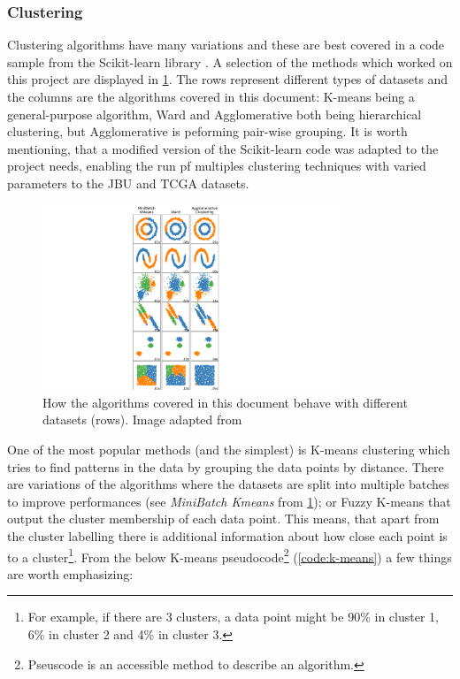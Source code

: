 \subsubsection{Clustering} \label{s:lit:clustering}

Clustering algorithms have many variations and these are best covered in a code sample \cite{Scikit-learn_undated-ax} from the Scikit-learn library \cite{Pedregosa2011-ts}. A selection of the methods which worked on this project are displayed in \cref{fig:clustering_types}. The rows represent different types of datasets and the columns are the algorithms covered in this document: K-means being a general-purpose algorithm, Ward and Agglomerative both being hierarchical clustering, but Agglomerative is peforming pair-wise grouping. It is worth mentioning, that a modified version of the Scikit-learn code was adapted to the project needs, enabling the run pf multiples clustering techniques with varied parameters to the JBU and TCGA datasets. 

\begin{figure}[!htb]
  \centering\includegraphics[width=0.8\textwidth,height=0.5\textheight,keepaspectratio]{Images/Clustering/scikit_selected.png}
    \caption{How the algorithms covered in this document behave with different datasets (rows). Image adapted from \cite{Scikit-learn_undated-ax}}
    \label{fig:clustering_types}
\end{figure}
\FloatBarrier

One of the most popular methods (and the simplest) is K-means clustering which tries to find patterns in the data by grouping the data points by distance. There are variations of the algorithms where the datasets are split into multiple batches to improve performances (see \textit{MiniBatch Kmeans} from  \cref{fig:clustering_types}); or Fuzzy K-means that output the cluster membership of each data point. This means, that apart from the cluster labelling there is additional information about how close each point is to a cluster\footnote{For example, if there are 3 clusters, a data point might be 90\% in cluster 1, 6\% in cluster 2 and 4\% in cluster 3.}. From the below K-means pseudocode\footnote{Pseuscode is an accessible method to describe an algorithm.} (\cref{code:k-means}) a few things are worth emphasizing:

